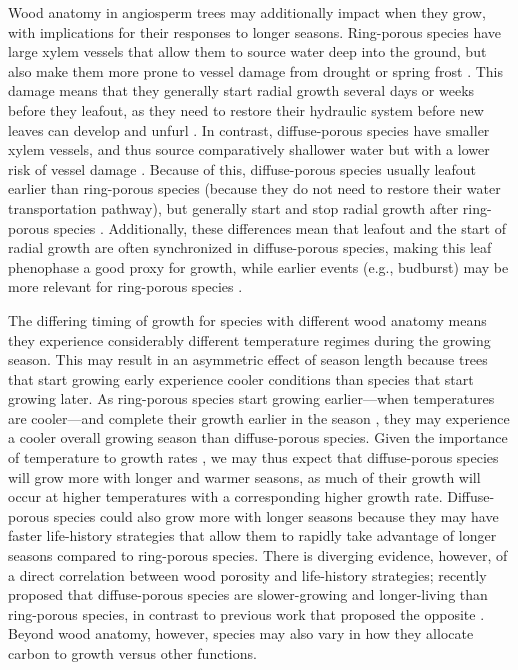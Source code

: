 \documentclass{article}\usepackage[]{graphicx}\usepackage[]{xcolor}
\begin{document}
Wood anatomy in angiosperm trees may additionally impact when they grow, with implications for their responses to longer seasons. Ring-porous species have large xylem vessels that allow them to source water deep into the ground, but also make them more prone to vessel damage from drought or spring frost \citep{taneda_casestudy_2008,kitin_earlywood_2016}. This damage means that they generally start radial growth several days or weeks before they leafout, as they need to restore their hydraulic system before new leaves can develop and unfurl \citep{barbaroux_contrasting_2002,hesslCarbonUptakeStorage2026,savageLeafOutTime2022,dorangeville_peak_2022}. In contrast, diffuse-porous species have smaller xylem vessels, and thus source comparatively shallower water but with a lower risk of vessel damage \citep{yin_ring_2023}. Because of this, diffuse-porous species usually leafout earlier than ring-porous species (because they do not need to restore their water transportation pathway), but generally start and stop radial growth after ring-porous species \citep{michelot_comparing_2012,dorangeville_peak_2022,yin_ring_2023}. Additionally, these differences mean that leafout and the start of radial growth are often synchronized in diffuse-porous species, making this leaf phenophase a good proxy for growth, while earlier events (e.g., budburst) may be more relevant for ring-porous species \citep{cufar_treering_2008}.

The differing timing of growth for species with different wood anatomy means they experience considerably different temperature regimes during the growing season. This may result in an asymmetric effect of season length because trees that start growing early experience cooler conditions than species that start growing later. As ring-porous species start growing earlier---when temperatures are cooler---and complete their growth earlier in the season \citep{michelot_comparing_2012,dorangeville_peak_2022}, they may experience a cooler overall growing season than diffuse-porous species. Given the importance of temperature to growth rates \citep{chuine_processbased_2017,wang_simulation_1998}, we may thus expect that diffuse-porous species will grow more with longer and warmer seasons, as much of their growth will occur at higher temperatures with a corresponding higher growth rate. Diffuse-porous species could also grow more with longer seasons because they may have faster life-history strategies that allow them to rapidly take advantage of longer seasons compared to ring-porous species. There is diverging evidence, however, of a direct correlation between wood porosity and life-history strategies; \cite{lv_xylem_2025} recently proposed that diffuse-porous species are slower-growing and longer-living than ring-porous species, in contrast to previous work that proposed the opposite \citep{taneda_casestudy_2008}. Beyond wood anatomy, however, species may also vary in how they allocate carbon to growth versus other functions.
\end{document}
